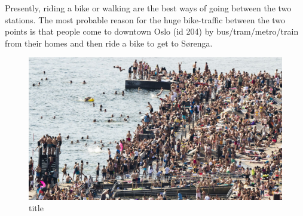 \documentclass[11pt]{article}
\makeatletter
\def\maxwidth{\ifdim\Gin@nat@width>\linewidth\linewidth
    \else\Gin@nat@width\fi}
\let\Oldincludegraphics\includegraphics
\renewcommand{\includegraphics}[1]{\Oldincludegraphics[width=.8\maxwidth]{#1}}
\makeatother
\begin{document}
Presently, riding a bike or walking are the best ways of going between
the two stations. The most probable reason for the huge bike-traffic
between the two points is that people come to downtown Oslo (id 204) by
bus/tram/metro/train from their homes and then ride a bike to get to
Sørenga.

    \begin{figure}
\centering
\includegraphics{sorenga.jpeg}
\caption{title}
\end{figure}


    
    
    
    
\end{document}
